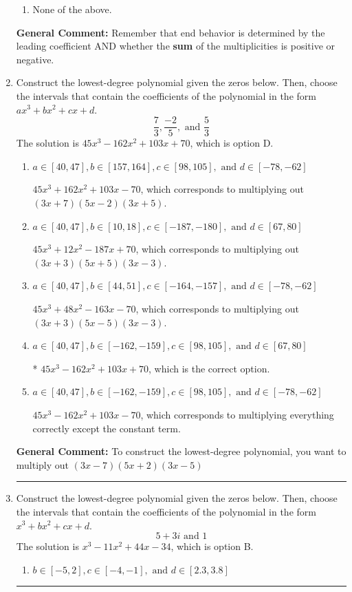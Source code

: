 \documentclass{extbook}[14pt]
\newcommand{\litem}[1]{\item #1

\rule{\textwidth}{0.4pt}}
\begin{document}
\begin{enumerate}
{\begin{enumerate}[label=\Alph*.]
\begin{multicols}{2}
\end{multicols}\item None of the above.\end{enumerate}
\textbf{General Comment:} Remember that end behavior is determined by the leading coefficient AND whether the \textbf{sum} of the multiplicities is positive or negative.
}
\litem{
Construct the lowest-degree polynomial given the zeros below. Then, choose the intervals that contain the coefficients of the polynomial in the form $ax^3+bx^2+cx+d$.
\[ \frac{7}{3}, \frac{-2}{5}, \text{ and } \frac{5}{3} \]
The solution is \( 45x^{3} -162 x^{2} +103 x + 70 \), which is option D.\begin{enumerate}[label=\Alph*.]
\item \( a \in [40, 47], b \in [157, 164], c \in [98, 105], \text{ and } d \in [-78, -62] \)

$45x^{3} +162 x^{2} +103 x -70$, which corresponds to multiplying out $(3x + 7)(5x -2)(3x + 5)$.
\item \( a \in [40, 47], b \in [10, 18], c \in [-187, -180], \text{ and } d \in [67, 80] \)

$45x^{3} +12 x^{2} -187 x + 70$, which corresponds to multiplying out $(3x + 3)(5x + 5)(3x -3)$.
\item \( a \in [40, 47], b \in [44, 51], c \in [-164, -157], \text{ and } d \in [-78, -62] \)

$45x^{3} +48 x^{2} -163 x -70$, which corresponds to multiplying out $(3x + 3)(5x -5)(3x -3)$.
\item \( a \in [40, 47], b \in [-162, -159], c \in [98, 105], \text{ and } d \in [67, 80] \)

* $45x^{3} -162 x^{2} +103 x + 70$, which is the correct option.
\item \( a \in [40, 47], b \in [-162, -159], c \in [98, 105], \text{ and } d \in [-78, -62] \)

$45x^{3} -162 x^{2} +103 x -70$, which corresponds to multiplying everything correctly except the constant term.
\end{enumerate}

\textbf{General Comment:} To construct the lowest-degree polynomial, you want to multiply out $(3x -7)(5x + 2)(3x -5)$
}
\litem{
Construct the lowest-degree polynomial given the zeros below. Then, choose the intervals that contain the coefficients of the polynomial in the form $x^3+bx^2+cx+d$.
\[ 5 + 3 i \text{ and } 1 \]
The solution is \( x^{3} -11 x^{2} +44 x -34 \), which is option B.\begin{enumerate}[label=\Alph*.]
\item \( b \in [-5, 2], c \in [-4, -1], \text{ and } d \in [2.3, 3.8] \)


\end{enumerate}}
\end{enumerate}
\end{document}
